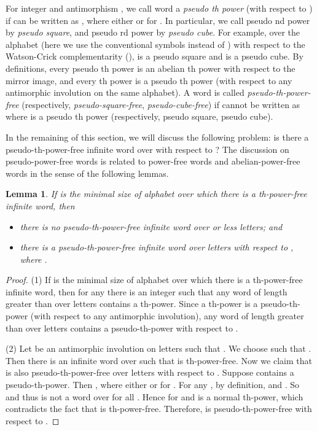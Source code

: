\documentclass[12pt]{article}
\newtheorem{lemma}[theorem]{Lemma}
\begin{document}
For integer  and antimorphism , we call word  a
\emph{pseudo th power} (with respect to ) if  can be
written as , where either  or
 for . In particular, we call
pseudo nd power by \emph{pseudo square}, and pseudo rd power
by \emph{pseudo cube}. For example, over the alphabet  (here we use the conventional symbols
instead of ) with respect to the
Watson-Crick complementarity (),  is a pseudo square and  is a pseudo cube. By definitions, every
pseudo th power is an abelian th power with respect to the
mirror image, and every th power is a pseudo th power (with
respect to any antimorphic involution on the same alphabet). A word
 is called \emph{pseudo-th-power-free} (respectively,
\emph{pseudo-square-free}, \emph{pseudo-cube-free}) if  cannot be
written as  where  is a pseudo th power (respectively,
pseudo square, pseudo cube).


In the remaining of this section, we will discuss the following
problem: is there a pseudo-th-power-free infinite word over
 with respect to ? The discussion on
pseudo-power-free words is related to power-free words and
abelian-power-free words in the sense of the following lemmas.


\begin{lemma}\label{lemma:lemma0}
If  is the minimal size of alphabet over which there is a
th-power-free infinite word, then
\begin{itemize}
  \item[(1)] there is no pseudo-th-power-free infinite word over  or less letters;
  and
  \item[(2)] there is a pseudo-th-power-free infinite word over  letters
  with respect to , where .
\end{itemize}
\end{lemma}
\begin{proof}
(1) If  is the minimal size of alphabet over which there is a
th-power-free infinite word, then for any  there is an
integer  such that any word of length greater than  over 
letters contains a th-power. Since a th-power is a
pseudo-th-power (with respect to any antimorphic involution), any
word of length greater than  over  letters contains a
pseudo-th-power with respect to .

(2) Let  be an antimorphic involution on  letters such
that . We choose
 such that . Then
there is an infinite word  over  such that  is
th-power-free. Now we claim that  is also
pseudo-th-power-free over  letters with respect to .
Suppose  contains a pseudo-th-power. Then , where either  or  for . For any , by definition,  and
. So  and
thus  is not a word over  for all . Hence  for  and  is
a normal th-power, which contradicts the fact that  is
th-power-free. Therefore,  is pseudo-th-power-free with
respect to .
\end{proof}
\end{document}

